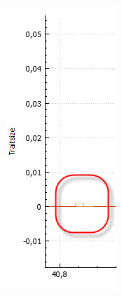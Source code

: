 \documentclass[11pt, a4paper, german]{article}
\theoremstyle{plain}
\begin{document}
\begin{center}
\begin{minipage}{0.6\textwidth}
\begin{minipage}{0.45\textwidth}
		\label{a}
	\end{minipage}
	$ \quad $
	\begin{minipage}{0.45\textwidth}
		\centering
		\includegraphics[width=1\linewidth]{./Pictures/TSS_MutationZoomVgl2_original}
		\label{b}
	\end{minipage}
	\end{minipage}
	\end{center}	
\end{document}
